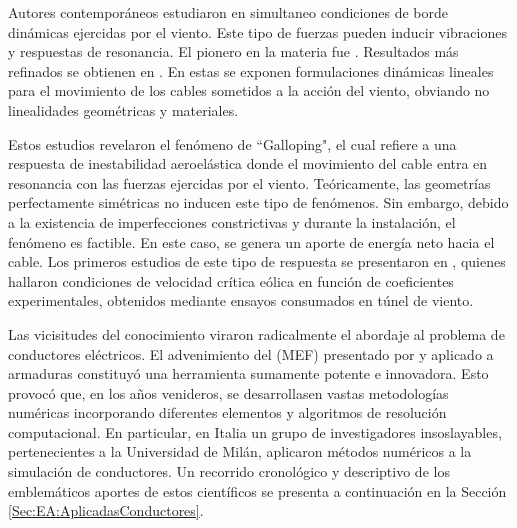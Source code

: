 Autores contemporáneos estudiaron en simultaneo condiciones de borde dinámicas ejercidas por el viento. Este tipo de fuerzas pueden inducir vibraciones y respuestas de resonancia. El pionero en la materia fue \cite{Davenport1965}. Resultados más refinados se obtienen en \citep{Starossek1991}. En estas se exponen formulaciones dinámicas lineales para el movimiento de los cables sometidos a la acción del viento, obviando no linealidades geométricas y materiales. 

Estos estudios revelaron el fenómeno de ``Galloping", el cual refiere a una respuesta de inestabilidad aeroelástica donde el movimiento del cable entra en resonancia con las fuerzas ejercidas por el viento. Teóricamente, las geometrías perfectamente simétricas no inducen este tipo de fenómenos. Sin embargo, debido a la existencia de imperfecciones constrictivas y durante la instalación, el fenómeno es factible. En este caso, se genera un aporte de energía neto hacia el cable. Los primeros estudios de este tipo de respuesta se presentaron en \citep{Simiu1986}, quienes hallaron condiciones de velocidad crítica eólica en función de coeficientes experimentales, obtenidos mediante ensayos consumados en túnel de viento. 

Las vicisitudes del conocimiento viraron radicalmente el abordaje al problema de conductores eléctricos. El advenimiento del (\gls{MEF}) presentado por \cite{zienkiewicz1970finite} y aplicado a armaduras constituyó una herramienta sumamente potente e innovadora. Esto provocó que, en los años venideros, se desarrollasen vastas metodologías numéricas incorporando diferentes elementos y algoritmos de resolución computacional. En particular, en Italia un grupo de investigadores insoslayables, pertenecientes a la Universidad de Milán, aplicaron métodos numéricos a la simulación de conductores. Un recorrido cronológico y descriptivo de los emblemáticos aportes de estos científicos se presenta a continuación en la Sección \ref{Sec:EA:AplicadasConductores}.

